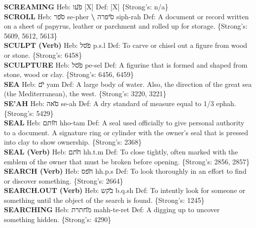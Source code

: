 {\textbf{SCREAMING} Heb: {\large\H פעו} {[}X{]} Def: {[}X{]} \{Strong's: n/a\}\hfill{}\\

\textbf{SCROLL} Heb: {\large\H ספר} se-pher \textbf{\textbackslash{}} {\large\H סיפרה} siph-rah Def: A document or record written on a sheet of papyrus, leather or parchment and rolled up for storage. \{Strong's: 5609, 5612, 5613\}\hfill{}\\

\textbf{SCULPT (Verb)} Heb: {\large\H פסל} p.s.l Def: To carve or chisel out a figure from wood or stone. \{Strong's: 6458\}\hfill{}\\

\textbf{SCULPTURE} Heb: {\large\H פסל} pe-sel Def: A figurine that is formed and shaped from stone, wood or clay. \{Strong's: 6456, 6459\}\hfill{}\\

\textbf{SEA} Heb: {\large\H ים} yam Def: A large body of water. Also, the direction of the great sea (the Mediterranean), the west. \{Strong's: 3220, 3221\}\hfill{}\\

\textbf{SE'AH} Heb: {\large\H סאה} se-ah Def: A dry standard of measure equal to 1/3 ephah. \{Strong's: 5429\}\hfill{}\\

\textbf{SEAL} Heb: {\large\H חותם} hho-tam Def: A seal used officially to give personal authority to a document. A signature ring or cylinder with the owner's seal that is pressed into clay to show ownership. \{Strong's: 2368\}\hfill{}\\

\textbf{SEAL (Verb)} Heb: {\large\H חתם} hh.t.m Def: To close tightly, often marked with the emblem of the owner that must be broken before opening. \{Strong's: 2856, 2857\}\hfill{}\\

\textbf{SEARCH (Verb)} Heb: {\large\H חפס} hh.p.s Def: To look thoroughly in an effort to find or discover something. \{Strong's: 2664\}\hfill{}\\

\textbf{SEARCH.OUT (Verb)} Heb: {\large\H בקש} b.q.sh Def: To intently look for someone or something until the object of the search is found. \{Strong's: 1245\}\hfill{}\\

\textbf{SEARCHING} Heb: {\large\H מחתרת} mahh-te-ret Def: A digging up to uncover something hidden. \{Strong's: 4290\}\hfill{}\\

}
